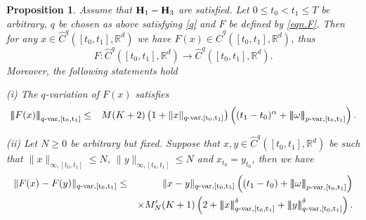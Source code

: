 \documentclass[10pt]{article}
\numberwithin{equation}{section} %
\newcommand{\R}{\ensuremath{\mathbb{R}}}
\newcommand{\ltn}{\ensuremath{\left| \! \left| \! \left|}}
\newcommand{\rtn}{\ensuremath{\right| \! \right| \! \right|}}
\newtheorem{proposition}[theorem]{Proposition}
\begin{document}
\begin{proposition}\label{EstIJ}
	Assume that ${\textbf H}_1-{\textbf H}_3$ are satisfied.  Let $0\leq t_0<t_1\leq T$ be arbitrary, $q$ be chosen as above satisfying \eqref{q} and $F$ be defined by \eqref{eqn.F}. Then for any 
	$x\in \widehat{C}^{q}([t_0,t_1],\R^d)$ we have $F(x)\in \widehat{C}^{q}([t_0,t_1],\R^d)$, thus
	$$
	F: \widehat{C}^{q}([t_0,t_1],\R^d)\longrightarrow  \widehat{C}^{q}([t_0,t_1],\R^d).
	$$
	Moreover, the following statements hold
	
	(i) The $q$-variation of $F(x)$ satisfies
	\begin{eqnarray}
	\ltn F(x)\rtn_{q\text{-}\rm{var},[t_0,t_1]}&\leq& M(K+2)\left(1+\|x\|_{q\text{-}\rm{var},[t_0,t_1]}\right) \left((t_1-t_0)^{\alpha}+\ltn\omega\rtn_{p\text{-}\rm{var},[t_0,t_1]}\right).\label{Fx}
\end{eqnarray}	

(ii) Let $N\geq 0$ be arbitrary but fixed. Suppose that $x,y\in\widehat{C}^{q}([t_{0},t_{1}],\R^d)$ be such that $\|x\|_{\infty,[t_0,t_1]}\leq N$, $\|y\|_{\infty,[t_0,t_1]}\leq N$ and $x_{t_0} = y_{t_0}$, then we have
	\begin{eqnarray}
	\|F(x)-F(y)\|_{q\text{-}\rm{var},[t_0,t_{1}]}&\leq& \|x-y\|_{q\text{-}\rm{var},[t_0,t_{1}]}\left((t_1-t_0)+\ltn\omega\rtn_{p\text{-}\rm{var},[t_0,t_1]}\right)\notag\\
	&& \times M'_N (K+1) \left(2+\ltn x\rtn^{\delta}_{q\text{-}\rm{var},[t_0,t_{1}]}+\ltn y\rtn^{\delta}_{q\text{-}\rm{var},[t_0,t_{1}]}\right).\label{Fxy}
	\end{eqnarray}
\end{proposition}%
\end{document}
